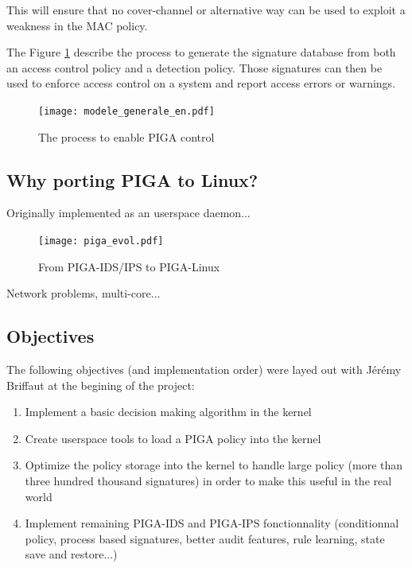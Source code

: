 \documentclass[pdftex,a4paper,titlepage,11pt]{article}
\begin{document}
\bigskip

This will ensure that no cover-channel or alternative way can be used to exploit
a weakness in the MAC policy.

\bigskip

The Figure \ref{PIGAARCHI} describe the process to generate the signature
database from both an access control policy and a detection policy. Those
signatures can then be used to enforce access control on a system and report
access errors or warnings.

\begin{figure}[h]
	\centering
	\texttt{[image: modele\_generale\_en.pdf]}
	\caption{The process to enable PIGA control}
	\label{PIGAARCHI}
\end{figure}

\subsection{Why porting PIGA to Linux?}

Originally implemented as an userspace daemon...

\begin{figure}[h]
	\centering
	\texttt{[image: piga\_evol.pdf]}
	\caption{From PIGA-IDS/IPS to PIGA-Linux}
	\label{PIGAEVOL}
\end{figure}

Network problems, multi-core...

\subsection{Objectives}

The following objectives (and implementation order) were layed out with Jérémy
Briffaut at the begining of the project:

\begin{enumerate}
	\item Implement a basic decision making algorithm in the kernel
	\item Create userspace tools to load a PIGA policy into the kernel
	\item Optimize the policy storage into the kernel to handle large policy
(more than three hundred thousand signatures) in order to make this useful in
the real world
	\item Implement remaining PIGA-IDS and PIGA-IPS fonctionnality (conditionnal
policy, process based signatures, better audit features, rule learning, state
save and restore...)
\end{enumerate}
\end{document}

